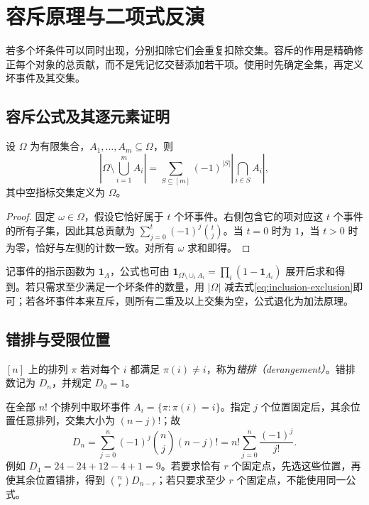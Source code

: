 \setcounter{chapter}{4} %
\chapter{容斥原理与二项式反演}
\label{ch:inclusion-exclusion}

若多个坏条件可以同时出现，分别扣除它们会重复扣除交集。容斥的作用是精确修正每个对象的总贡献，而不是凭记忆交替添加若干项。使用时先确定全集，再定义坏事件及其交集。

\section{容斥公式及其逐元素证明}

\begin{theorem}
设 $\Omega$ 为有限集合，$A_1,\ldots,A_m\subseteq\Omega$，则
\begin{equation}
  \left|\Omega\setminus\bigcup_{i=1}^m A_i\right|
  =\sum_{S\subseteq[m]}(-1)^{|S|}
    \left|\bigcap_{i\in S}A_i\right|,
  \label{eq:inclusion-exclusion}
\end{equation}
其中空指标交集定义为 $\Omega$。
\end{theorem}
\begin{proof}
固定 $\omega\in\Omega$，假设它恰好属于 $t$ 个坏事件。右侧包含它的项对应这 $t$ 个事件的所有子集，因此其总贡献为 $\sum_{j=0}^t(-1)^j\binom tj$。当 $t=0$ 时为 $1$，当 $t>0$ 时为零，恰好与左侧的计数一致。对所有 $\omega$ 求和即得。
\end{proof}

记事件的指示函数为 $\mathbf1_A$，公式也可由 $\mathbf1_{\Omega\setminus\cup_iA_i}=\prod_i(1-\mathbf1_{A_i})$ 展开后求和得到。若只需求至少满足一个坏条件的数量，用 $|\Omega|$ 减去式\eqref{eq:inclusion-exclusion}即可；若各坏事件本来互斥，则所有二重及以上交集为空，公式退化为加法原理。

\section{错排与受限位置}

\begin{definition}
$[n]$ 上的排列 $\pi$ 若对每个 $i$ 都满足 $\pi(i)\ne i$，称为\emph{错排（derangement）}。错排数记为 $D_n$，并规定 $D_0=1$。
\end{definition}

在全部 $n!$ 个排列中取坏事件 $A_i=\{\pi:\pi(i)=i\}$。指定 $j$ 个位置固定后，其余位置任意排列，交集大小为 $(n-j)!$；故
\begin{equation}
  D_n=\sum_{j=0}^n(-1)^j\binom nj(n-j)!
      =n!\sum_{j=0}^n\frac{(-1)^j}{j!}.
  \label{eq:derangements}
\end{equation}
例如 $D_4=24-24+12-4+1=9$。若要求恰有 $r$ 个固定点，先选这些位置，再使其余位置错排，得到 $\binom nrD_{n-r}$；若只要求至少 $r$ 个固定点，不能使用同一公式。

